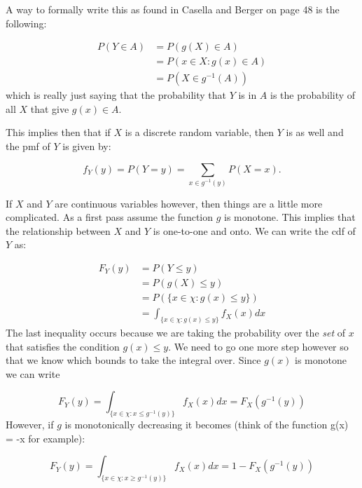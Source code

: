 A way to formally write this as found in Casella and Berger on page 48 is the following:

\begin{equation}
\begin{split}
P(Y \in A ) & = P(g(X) \in A) \\
&= P({x \in X: g(x) \in A}) \\
&= P(X \in g^{-1}(A))
\end{split}
\end{equation}
\noindent which is really just saying that the probability that $Y$ is in $A$ is the probability of all $X$ that give $g(x) \in A$. 

This implies then that if $X$ is a discrete random variable, then $Y$ is as well and the pmf of $Y$ is given by:

\begin{equation}\label{eq:pmf_transform}
f_Y(y) = P(Y=y) = \sum_{x\in g^{-1}(y)} P(X=x).
\end{equation}

If $X$ and $Y$ are continuous variables however, then things are a little more complicated. As a first pass assume the function $g$ is monotone. This implies that the relationship between $X$ and $Y$ is one-to-one and onto. We can write the cdf of $Y$ as:

\begin{equation}
\begin{split}
F_Y(y) &= P(Y \leq y) \\
&= P(g(X) \leq y) \\
&= P(\{x \in \chi :g(x) \leq y \}) \\
&= \int_{\{x \in \chi: g(x) \leq y \}} f_X(x) dx
\end{split}
\end{equation}
\noindent The last inequality occurs because we are taking the probability over the \emph{set} of $x$ that satisfies the condition $g(x) \leq y$. We need to go one more step however so that we know which bounds to take the integral over. Since $g(x)$ is monotone we can write 

\begin{equation}
F_Y(y) = \int_{\{x \in \chi: x \leq g^{-1}(y) \}} f_X(x) dx = F_X(g^{-1}(y))
\end{equation}
\noindent However, if $g$ is monotonically decreasing it becomes (think of the function g(x) = -x for example):

\begin{equation}
F_Y(y) =  \int_{\{x \in \chi: x \geq g^{-1}(y) \}} f_X(x) dx = 1 - F_X(g^{-1}(y))
\end{equation}

